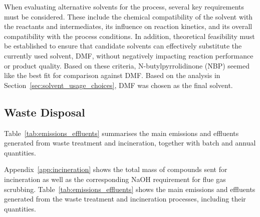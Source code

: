 When evaluating alternative solvents for the process, several key requirements must be considered. These include the chemical compatibility of the solvent with the reactants and intermediates, its influence on reaction kinetics, and its overall compatibility with the process conditions. In addition, theoretical feasibility must be established to ensure that candidate solvents can effectively substitute the currently used solvent, DMF, without negatively impacting reaction performance or product quality. Based on these criteria, N-butylpyrrolidinone (NBP) \cite{Kumar_NBP_2020} seemed like the best fit for comparison against DMF. Based on the analysis in Section~\ref{sec:solvent_usage_choices}, DMF was chosen as the final solvent.

\subsection{Waste Disposal}
\label{sec:waste_disposal}



Table~\ref{tab:emissions_effluents} summarises the main emissions and effluents generated from waste treatment and incineration, together with batch and annual quantities.

Appendix~\ref{app:incineration} shows the total mass of compounds sent for incineration as well as the corresponding NaOH requirement for flue gas scrubbing. Table~\ref{tab:emissions_effluents} shows the main emissions and effluents generated from the waste treatment and incineration processes, including their quantities.

